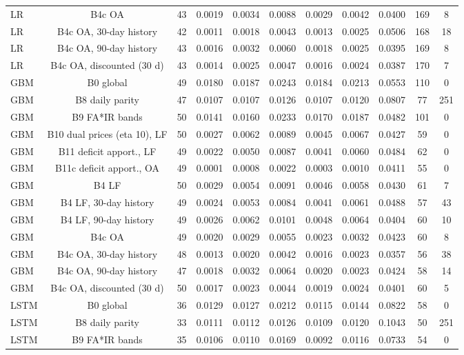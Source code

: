 \documentclass[10pt,onecolumn,letterpaper]{article}
\begin{document}
\begin{table}[!t]
{\begin{tabular}{lcccccccccc}
LR & B4c OA & 43 & 0.0019 & 0.0034 & 0.0088 & 0.0029 & 0.0042 & 0.0400 & 169 & 8 \\
LR & B4c OA, 30-day history & 42 & 0.0011 & 0.0018 & 0.0043 & 0.0013 & 0.0025 & 0.0506 & 168 & 18 \\
LR & B4c OA, 90-day history & 43 & 0.0016 & 0.0032 & 0.0060 & 0.0018 & 0.0025 & 0.0395 & 169 & 8 \\
LR & B4c OA, discounted (30 d) & 43 & 0.0014 & 0.0025 & 0.0047 & 0.0016 & 0.0024 & 0.0387 & 170 & 7 \\
GBM & B0 global & 49 & 0.0180 & 0.0187 & 0.0243 & 0.0184 & 0.0213 & 0.0553 & 110 & 0 \\
GBM & B8 daily parity & 47 & 0.0107 & 0.0107 & 0.0126 & 0.0107 & 0.0120 & 0.0807 & 77 & 251 \\
GBM & B9 FA*IR bands & 50 & 0.0141 & 0.0160 & 0.0233 & 0.0170 & 0.0187 & 0.0482 & 101 & 0 \\
GBM & B10 dual prices (eta 10), LF & 50 & 0.0027 & 0.0062 & 0.0089 & 0.0045 & 0.0067 & 0.0427 & 59 & 0 \\
GBM & B11 deficit apport., LF & 49 & 0.0022 & 0.0050 & 0.0087 & 0.0041 & 0.0060 & 0.0484 & 62 & 0 \\
GBM & B11c deficit apport., OA & 49 & 0.0001 & 0.0008 & 0.0022 & 0.0003 & 0.0010 & 0.0411 & 55 & 0 \\
GBM & B4 LF & 50 & 0.0029 & 0.0054 & 0.0091 & 0.0046 & 0.0058 & 0.0430 & 61 & 7 \\
GBM & B4 LF, 30-day history & 49 & 0.0024 & 0.0053 & 0.0084 & 0.0041 & 0.0061 & 0.0488 & 57 & 43 \\
GBM & B4 LF, 90-day history & 49 & 0.0026 & 0.0062 & 0.0101 & 0.0048 & 0.0064 & 0.0404 & 60 & 10 \\
GBM & B4c OA & 49 & 0.0020 & 0.0029 & 0.0055 & 0.0023 & 0.0032 & 0.0423 & 60 & 8 \\
GBM & B4c OA, 30-day history & 48 & 0.0013 & 0.0020 & 0.0042 & 0.0016 & 0.0023 & 0.0357 & 56 & 38 \\
GBM & B4c OA, 90-day history & 47 & 0.0018 & 0.0032 & 0.0064 & 0.0020 & 0.0023 & 0.0424 & 58 & 14 \\
GBM & B4c OA, discounted (30 d) & 50 & 0.0017 & 0.0023 & 0.0044 & 0.0019 & 0.0024 & 0.0401 & 60 & 5 \\
LSTM & B0 global & 36 & 0.0129 & 0.0127 & 0.0212 & 0.0115 & 0.0144 & 0.0822 & 58 & 0 \\
LSTM & B8 daily parity & 33 & 0.0111 & 0.0112 & 0.0126 & 0.0109 & 0.0120 & 0.1043 & 50 & 251 \\
LSTM & B9 FA*IR bands & 35 & 0.0106 & 0.0110 & 0.0169 & 0.0092 & 0.0116 & 0.0733 & 54 & 0 \\

\end{tabular}}
\end{table}
\end{document}
